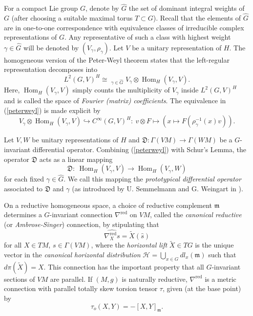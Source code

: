 \documentclass[12pt]{scrartcl}
\theoremstyle{plain}
\theoremstyle{definition}
\newcommand{\Hom}{\operatorname{Hom}}%
\renewcommand{\H}{\mathcal{H}}%
\newcommand{\m}{\mathfrak{m}}%
\DeclareMathOperator*{\closedsum}{\overline{\bigoplus}}%
\newcommand{\Do}{\mathfrak{D}}%
\newcommand{\CR}{\nabla^{\mathrm{red}}}%
\begin{document}
For a compact Lie group $G$, denote by $\hat{G}$ the set of dominant integral weights of $G$ (after choosing a suitable maximal torus $T\subset G$). Recall that the elements of $\hat G$ are in one-to-one correspondence with equivalence classes of irreducible complex representations of $G$. Any representative of such a class with highest weight $\gamma\in\hat G$ will be denoted by $(V_\gamma,\rho_\gamma)$. Let $V$ be a unitary representation of $H$. The homogeneous version of the Peter-Weyl theorem \cite[Thm.~5.3.6]{wallach} states that the left-regular representation decomposes into
\begin{equation}
L^2(G,V)^H\cong\closedsum_{\gamma\in\hat G}V_\gamma\otimes\Hom_H(V_\gamma,V).\label{peterweyl}%
\end{equation}
Here, $\Hom_H(V_\gamma,V)$ simply counts the multiplicity of $V_\gamma$ inside $L^2(G,V)^H$ and is called the space of \emph{Fourier (matrix) coefficients}. The equivalence in (\ref{peterweyl}) is made explicit by
\begin{equation}
V_\gamma\otimes\Hom_H(V_\gamma,V)\hookrightarrow C^\infty(G,V)^H:\ v\otimes F\mapsto\left(x\mapsto F(\rho_\gamma^{-1}(x)v)\right).\label{pwembedding}
\end{equation}

Let $V,W$ be unitary representations of $H$ and $\Do: \Gamma(VM)\to\Gamma(WM)$ be a $G$-invariant differential operator. Combining (\ref{peterweyl}) with Schur's Lemma, the operator $\Do$ acts as a linear mapping
\[\Do:\ \Hom_H(V_\gamma,V)\longrightarrow\Hom_H(V_\gamma,W)\]
for each fixed $\gamma\in\hat G$. We call this mapping the \emph{prototypical differential operator} associated to $\Do$ and $\gamma$ (as introduced by U. Semmelmann and G. Weingart in \cite{sw}).

On a reductive homogeneous space, a choice of reductive complement $\m$ determines a $G$-invariant connection $\CR$ on $VM$, called the \emph{canonical reductive} (or \emph{Ambrose-Singer}) connection, by stipulating that
\begin{equation}
\widehat{\CR_Xs}=\tilde{X}(\hat s)\label{CR}%
\end{equation}
for all $X\in TM$, $s\in\Gamma(VM)$, where the \emph{horizontal lift} $\tilde X\in TG$ is the unique vector in the \emph{canonical horizontal distribution} $\H=\bigcup_{x\in G}dl_x(\m)$ such that $d\pi(\tilde X)=X$. This connection has the important property that all $G$-invariant sections of $VM$ are parallel. If $(M,g)$ is naturally reductive, $\CR$ is a metric connection with parallel totally skew torsion tensor $\tau$, given (at the base point) by
\[\tau_o(X,Y)=-[X,Y]_\m.\]
\end{document}
